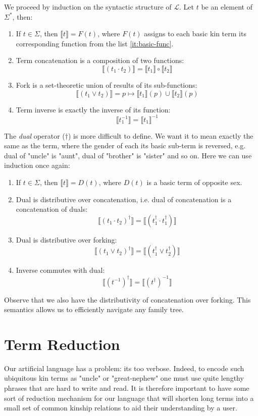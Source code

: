     We proceed by induction on the syntactic structure of $\mathcal{L}$. Let $t$ be an element of $\Sigma^*$, then:
    \begin{enumerate}
        \item{If $t \in \Sigma$, then $\llbracket t \rrbracket = F(t)$, where $F(t)$ assigns to each basic kin term its corresponding
            function from the list \ref{it:basic-func}.}
        \item{Term concatenation is a composition of two functions:
            \[\llbracket (t_1 \cdot t_2) \rrbracket = \llbracket t_1 \rrbracket \circ \llbracket t_2 \rrbracket\]}
        \item{Fork is a set-theoretic union of results of its sub-functions:
            \[\llbracket (t_1 \vee t_2) \rrbracket = p \mapsto \llbracket t_1 \rrbracket(p) \cup \llbracket t_2
        \rrbracket(p)\]}
        \item{Term inverse is exactly the inverse of its function:
            \[\llbracket t_1^{-1} \rrbracket = \llbracket t_1 \rrbracket^{-1}\]}
    \end{enumerate}
    The \textit{dual} operator ($\dagger$) is more difficult to define. We want it to mean exactly the same as the term, where the
    gender of each its basic sub-term is reversed, e.g. dual of "uncle" is "aunt", dual of "brother" is "sister" and so on.
    Here we can use induction once again:
    \begin{enumerate}
        \item{If $t \in \Sigma$, then $\llbracket t \rrbracket = D(t)$, where $D(t)$ is a basic term of opposite sex.}
        \item{Dual is distributive over concatenation, i.e. dual of concatenation is a concatenation of duals:
            \[\llbracket (t_1 \cdot t_2)^\dagger \rrbracket = \llbracket (t_1^\dagger \cdot t_1^\dagger) \rrbracket\]}
        \item{Dual is distributive over forking:
            \[\llbracket (t_1 \vee t_2)^\dagger \rrbracket = \llbracket (t_1^\dagger \vee t_2^\dagger ) \rrbracket\]}
        \item{Inverse commutes with dual:
                \[\llbracket (t^{-1})^{\dagger} \rrbracket = \llbracket (t^{\dagger})^{-1} \rrbracket\]}
    \end{enumerate}
    Observe that we also have the distributivity of concatenation over forking.
    This semantics allows us to efficiently navigate any family tree.

\section{Term Reduction}
\label{sec:reduc}
    Our artificial language has a problem: its too verbose. Indeed, to encode such ubiquitous kin terms as "uncle" or "great-nephew" one
    must use quite lengthy phrases that are hard to write and read. It is therefore important to have some sort of reduction mechanism
    for our language that will shorten long terms into a small set of common kinship relations to aid their understanding by a user.

